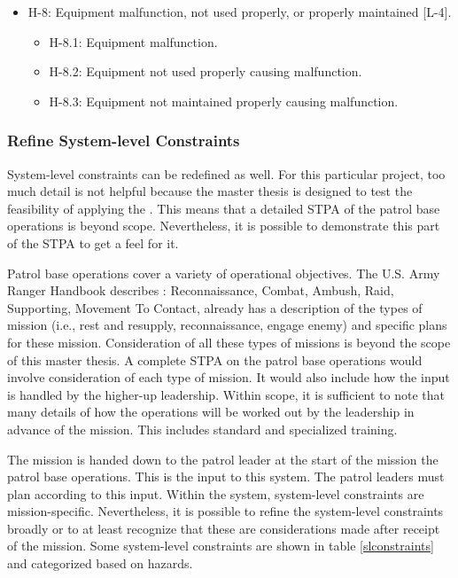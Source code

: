 \documentclass[../../main/main.tex]{subfiles}
\begin{document}
\begin{itemize}
\item H-8: Equipment malfunction, not used properly, or properly maintained [L-4].\\
\begin{itemize}
\item H-8.1: Equipment malfunction.
\item H-8.2: Equipment not used properly causing malfunction.
\item H-8.3: Equipment not maintained properly causing malfunction.
\end{itemize}


\end{itemize}

\subsubsection{Refine System-level Constraints}
System-level constraints can be redefined as well.  For this particular project, too much detail is not helpful because the master thesis is designed to test the feasibility of applying the .  This means that a detailed STPA of the patrol base operations is beyond scope.  Nevertheless, it is possible to demonstrate this part of the STPA to get a feel for it.


Patrol base operations cover a variety of operational objectives.  The U.S. Army Ranger Handbook describes : Reconnaissance, Combat, Ambush, Raid, Supporting, Movement To Contact, already has a description of the types of mission (i.e., rest and resupply, reconnaissance, engage enemy) and specific plans for these mission.  Consideration of all these types of missions is beyond the scope of this master thesis. A complete STPA on the patrol base operations would involve consideration of each type of mission.  It would also include how the input is handled by the higher-up leadership.  Within scope, it is sufficient to note that many details of how the operations will be worked out by the leadership in advance of the mission.  This includes standard and specialized training.  

The mission is handed down to the patrol leader at the start of the mission the patrol base operations. This is the input to this system.  The patrol leaders must plan according to this input. Within the system, system-level constraints are mission-specific. Nevertheless, it is possible to refine the system-level constraints broadly or to at least recognize that these are considerations made after receipt of the mission. Some system-level constraints are shown in table \ref{slconstraints} and categorized based on hazards.
\end{document}
